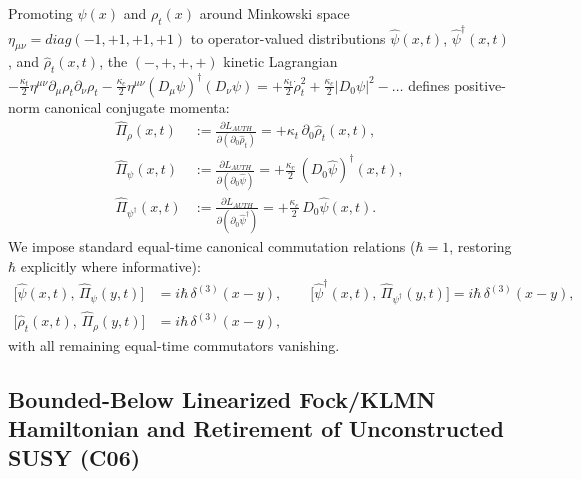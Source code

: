 \documentclass[american,11pt,letterpaper]{article}
\def\mathbf#1{#1}%
\def\mathcal#1{#1}%
\def\mathrm#1{#1}%
\def\texttt#1{#1}%
\begin{document}
Promoting $\psi(x)$ and $\rho_t(x)$ around Minkowski space $\eta_{\mu\nu} = \mathrm{diag}(-1,+1,+1,+1)$ to operator-valued distributions $\hat{\psi}(\mathbf{x},t)$, $\hat{\psi}^\dagger(\mathbf{x},t)$, and $\hat{\rho}_t(\mathbf{x},t)$, the $(-,+,+,+)$ kinetic Lagrangian $-\frac{\kappa_t}{2}\eta^{\mu\nu}\partial_\mu\rho_t\partial_\nu\rho_t - \frac{\kappa_c}{2}\eta^{\mu\nu}(D_\mu\psi)^\dagger(D_\nu\psi) = +\frac{\kappa_t}{2}\dot{\rho}_t^2 + \frac{\kappa_c}{2}|D_0\psi|^2 - \dots$ defines positive-norm canonical conjugate momenta:
\begin{align}
\hat{\Pi}_\rho(\mathbf{x},t) &:= \frac{\partial\mathcal{L}_{\mathrm{AUTH}}}{\partial(\partial_0\hat{\rho}_t)} = +\kappa_t\,\partial_0\hat{\rho}_t(\mathbf{x},t), \label{eq:canon_mom_rho}\\
\hat{\Pi}_\psi(\mathbf{x},t) &:= \frac{\partial\mathcal{L}_{\mathrm{AUTH}}}{\partial(\partial_0\hat{\psi})} = +\frac{\kappa_c}{2}\,(D_0\hat{\psi})^\dagger(\mathbf{x},t), \label{eq:canon_mom_psi}\\
\hat{\Pi}_{\psi^\dagger}(\mathbf{x},t) &:= \frac{\partial\mathcal{L}_{\mathrm{AUTH}}}{\partial(\partial_0\hat{\psi}^\dagger)} = +\frac{\kappa_c}{2}\,D_0\hat{\psi}(\mathbf{x},t). \label{eq:canon_mom_psidag}
\end{align}
We impose standard equal-time canonical commutation relations ($\hbar = 1$, restoring $\hbar$ explicitly where informative):
\begin{align}
\bigl[\hat{\psi}(\mathbf{x},t),\,\hat{\Pi}_\psi(\mathbf{y},t)\bigr] &= i\hbar\,\delta^{(3)}(\mathbf{x}-\mathbf{y}),
\qquad
\bigl[\hat{\psi}^\dagger(\mathbf{x},t),\,\hat{\Pi}_{\psi^\dagger}(\mathbf{y},t)\bigr] = i\hbar\,\delta^{(3)}(\mathbf{x}-\mathbf{y}), \nonumber\\
\bigl[\hat{\rho}_t(\mathbf{x},t),\,\hat{\Pi}_\rho(\mathbf{y},t)\bigr] &= i\hbar\,\delta^{(3)}(\mathbf{x}-\mathbf{y}),
\label{eq:equal_time_ccr}
\end{align}
with all remaining equal-time commutators vanishing.

\subsection{Bounded-Below Linearized Fock/KLMN Hamiltonian and Retirement of Unconstructed SUSY (\texttt{C06})}
\end{document}
